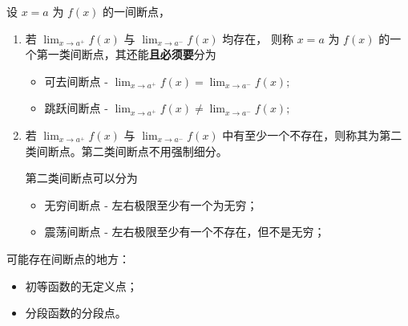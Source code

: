 设 $ x=a $ 为 $ f(x) $ 的一间断点，
\begin{enumerate}
    \item 若 $ {\displaystyle\lim_{x\rightarrow a^+}}f(x) $ 与 $ {\displaystyle\lim_{x\rightarrow a^-}}f(x) $ 均存在，
    则称 $ x=a $ 为 $ f(x) $ 的一个第一类间断点，其还能\textbf{且必须要}分为\begin{itemize}
        \item 可去间断点 - 
        $ {\displaystyle\lim_{x\rightarrow a^+}}f(x)={\displaystyle\lim_{x\rightarrow a^-}}f(x); $
        \item 跳跃间断点 - 
        $ {\displaystyle\lim_{x\rightarrow a^+}}f(x)\neq{\displaystyle\lim_{x\rightarrow a^-}}f(x); $
    \end{itemize}
    \item 若 $ {\displaystyle\lim_{x\rightarrow a^+}}f(x) $ 与 $ {\displaystyle\lim_{x\rightarrow a^-}}f(x) $ 
    中有至少一个不存在，则称其为第二类间断点。第二类间断点不用强制细分。

    第二类间断点可以分为
    \begin{itemize}
        \item 无穷间断点 - 左右极限至少有一个为无穷；
        \item 震荡间断点 - 左右极限至少有一个不存在，但不是无穷；
    \end{itemize}
\end{enumerate}

可能存在间断点的地方：
\begin{itemize}
    \item 初等函数的无定义点；
    \item 分段函数的分段点。
\end{itemize}

